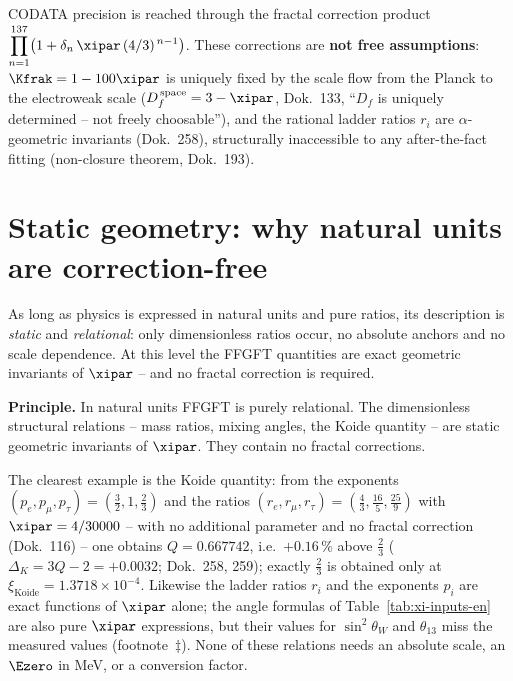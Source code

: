 \begin{table}[htbp]
  CODATA precision is reached through the fractal correction product
  $\displaystyle\prod_{n=1}^{137}\!\big(1+\delta_n\,\xipar\,(4/3)^{\,n-1}\big)$.
  These corrections are \textbf{not free assumptions}: $\Kfrak=1-100\xipar$ is uniquely
  fixed by the scale flow from the Planck to the electroweak scale
  ($D_f^{\,\mathrm{space}}=3-\xipar$, Dok.~133, ``$D_f$ is uniquely determined --
  not freely choosable''), and the rational ladder ratios $r_i$ are
  $\alpha$-geometric invariants (Dok.~258), structurally inaccessible to any
  after-the-fact fitting (non-closure theorem, Dok.~193).
\end{table}

\section{Static geometry: why natural units are correction-free}

As long as physics is expressed in natural units and pure ratios, its description
is \emph{static} and \emph{relational}: only dimensionless ratios occur, no
absolute anchors and no scale dependence. At this level the FFGFT quantities are
exact geometric invariants of $\xipar$ -- and no fractal correction is required.

\begin{principle}
\textbf{Principle.} In natural units FFGFT is purely relational. The dimensionless
structural relations -- mass ratios, mixing angles, the Koide quantity -- are
static geometric invariants of $\xipar$. They contain no fractal corrections.
\end{principle}

The clearest example is the Koide quantity: from the exponents
$(p_e,p_\mu,p_\tau)=(\tfrac{3}{2},1,\tfrac{2}{3})$ and the ratios
$(r_e,r_\mu,r_\tau)=(\tfrac{4}{3},\tfrac{16}{5},\tfrac{25}{9})$ with
$\xipar=4/30000$ -- with no additional parameter and no fractal correction
(Dok.~116) -- one obtains $Q=0.667742$, i.e.\ $+0.16\,\%$ above $\tfrac{2}{3}$
($\Delta_K=3Q-2=+0.0032$; Dok.~258, 259); exactly $\tfrac{2}{3}$ is obtained
only at $\xi_{\text{Koide}}=1.3718\times10^{-4}$. Likewise the ladder ratios
$r_i$ and the exponents $p_i$ are exact functions of $\xipar$ alone; the angle
formulas of Table~\ref{tab:xi-inputs-en} are also pure $\xipar$ expressions,
but their values for $\sin^2\theta_W$ and $\theta_{13}$ miss the measured values
(footnote~$\ddagger$). None of these relations needs an absolute
scale, an $\Ezero$ in MeV, or a conversion factor.


